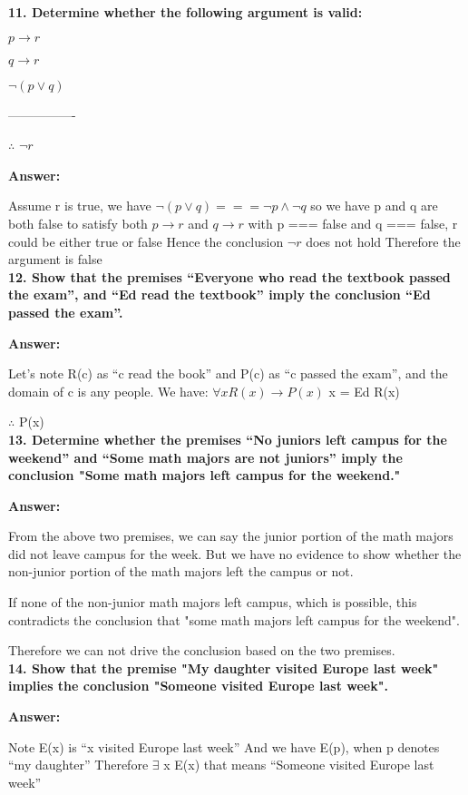 \documentclass{article}
\begin{document}
\begin{large}
\textbf{11. Determine whether the following argument is valid:}

\textbf{$p \to r$}

\textbf{$q \to r$}

\textbf{$\lnot (p \lor q)$}

----------------

$\therefore$ $\lnot r$


\textbf{Answer:}


Assume r is true, 
we have $\lnot (p \lor q) === \lnot p \land \lnot q$ so we have p and q are both false
to satisfy both {$p \to r$} and {$q \to r$} with p === false and q === false,
r could be either true or false
Hence the conclusion $\lnot r$ does not hold
Therefore the argument is false\\

\textbf{12. Show that the premises ``Everyone who read the textbook passed the exam'', and ``Ed read the textbook'' imply the conclusion ``Ed passed the exam''.}

\textbf{Answer:}

Let's note R(c) as ``c read the book'' and P(c) as ``c passed the exam'', and the domain of c is any people.
We have:
$\forall x R(x) \to P(x)$
x = Ed
R(x)

$\therefore$ P(x)\\

\textbf{13. Determine whether the premises ``No juniors left campus for the weekend'' and ``Some math majors are not juniors'' imply the conclusion "Some math majors left campus for the weekend."}

\textbf{Answer:}

From the above two premises, we can say the junior portion of the math majors did not leave campus for the week. But we have no evidence to show whether the non-junior portion of the math majors left the campus or not.

If none of the non-junior math majors left campus, which is possible, this contradicts the conclusion that "some math majors left campus for the weekend". 

Therefore we can not drive the conclusion based on the two premises. \\

\textbf{14. Show that the premise "My daughter visited Europe last week" implies the conclusion "Someone visited Europe last week".}

\textbf{Answer:}

Note E(x) is ``x visited Europe last week''
And we have E(p), when p denotes ``my daughter''
Therefore $\exists$ x E(x) that means ``Someone visited Europe last week''\\


\end{large}
\end{document}
